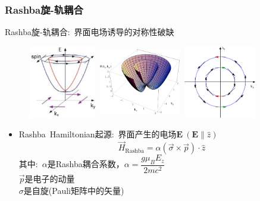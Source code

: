 \frame
{
	\frametitle{\textrm{Rashba}旋-轨耦合}
	\textrm{Rashba}旋-轨耦合:~界面电场诱导的对称性破缺
\begin{figure}[h!]
\centering
\vspace*{+0.05in}
\includegraphics[height=1.25in,width=1.20in,viewport=0 0 700 760,clip]{Figures/SOC_Rashba_effect.png}
\includegraphics[height=1.25in,width=1.40in,viewport=0 0 750 600,clip]{Figures/SOC_Rashba-1.png}
\includegraphics[height=1.25in,width=1.30in,viewport=0 0 650 590,clip]{Figures/SOC_Rashba-2.png}
\label{Rashba_effect}
\end{figure}

	\begin{itemize}
	\item \textrm{Rashba~Hamiltonian}起源:~界面产生的电场$\mathbf E~(\mathbf E\parallel \hat z)$%
		\begin{displaymath}
			\vec H_{\mathrm{Rashba}}=\alpha(\vec\sigma\times\vec p)\cdot\hat z
		\end{displaymath}
		其中:~$\alpha$是\textrm{Rashba}耦合系数，$\alpha=\dfrac{g\mu_BE_z}{2mc^2}$\\
		$\vec p$是电子的动量\\
		$\sigma$是自旋(\textrm{Pauli}矩阵中的矢量)
	\end{itemize}
}

